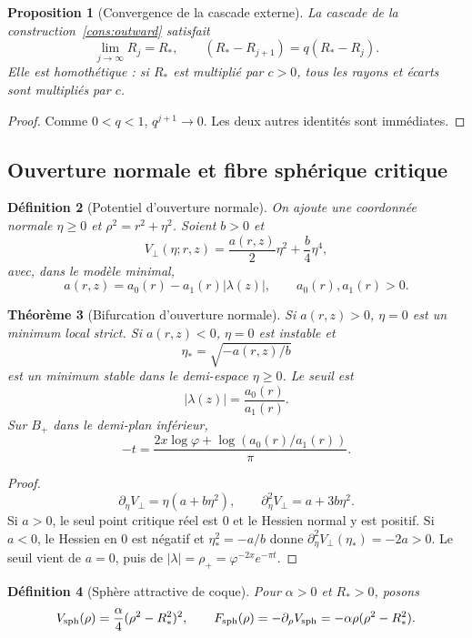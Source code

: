 \documentclass[11pt,a4paper]{article}
\newtheorem{theorem}{Théorème}[section]
\newtheorem{proposition}[theorem]{Proposition}
\newtheorem{definition}[theorem]{Définition}
\newcommand{\ph}{\varphi}
\begin{document}
\begin{proposition}[Convergence de la cascade externe]
La cascade de la construction~\ref{cons:outward} satisfait
\[
 \lim_{j\to\infty}R_j=R_*,
 \qquad
 (R_*-R_{j+1})=q(R_*-R_j).
\]
Elle est homothétique : si $R_*$ est multiplié par $c>0$, tous les rayons et écarts sont multipliés par $c$.
\end{proposition}

\begin{proof}
Comme $0<q<1$, $q^{j+1}\to0$. Les deux autres identités sont immédiates.
\end{proof}

\subsection{Ouverture normale et fibre sphérique critique}

\begin{definition}[Potentiel d'ouverture normale]
On ajoute une coordonnée normale $\eta\ge0$ et $\rho^2=r^2+\eta^2$. Soient $b>0$ et
\[
 V_\perp(\eta;r,z)=\frac{a(r,z)}2\eta^2+\frac b4\eta^4,
\]
avec, dans le modèle minimal,
\[
 a(r,z)=a_0(r)-a_1(r)|\lambda(z)|,
 \qquad a_0(r),a_1(r)>0.
\]
\end{definition}

\begin{theorem}[Bifurcation d'ouverture normale]\label{thm:opening}
Si $a(r,z)>0$, $\eta=0$ est un minimum local strict. Si $a(r,z)<0$, $\eta=0$ est instable et
\[
 \eta_* = \sqrt{-a(r,z)/b}
\]
est un minimum stable dans le demi-espace $\eta\ge0$. Le seuil est
\begin{equation}\label{eq:opening-threshold}
 |\lambda(z)|=\frac{a_0(r)}{a_1(r)}.
\end{equation}
Sur $B_+$ dans le demi-plan inférieur,
\[
 -t=\frac{2x\log\ph+\log(a_0(r)/a_1(r))}{\pi}.
\]
\end{theorem}

\begin{proof}
\[
 \partial_\eta V_\perp=\eta(a+b\eta^2),
 \qquad
 \partial_\eta^2V_\perp=a+3b\eta^2.
\]
Si $a>0$, le seul point critique réel est $0$ et le Hessien normal y est positif. Si $a<0$, le Hessien en $0$ est négatif et $\eta_*^2=-a/b$ donne $\partial_\eta^2V_\perp(\eta_*)=-2a>0$. Le seuil vient de $a=0$, puis de $|\lambda|=\rho_+=\ph^{-2x}e^{-\pi t}$.
\end{proof}

\begin{definition}[Sphère attractive de coque]
Pour $\alpha>0$ et $R_*>0$, posons
\[
 V_{\rm sph}(\rho)=\frac\alpha4(\rho^2-R_*^2)^2,
\qquad
 F_{\rm sph}(\rho)=-\partial_\rho V_{\rm sph}
 =-\alpha\rho(\rho^2-R_*^2).
\]
\end{definition}
\end{document}
